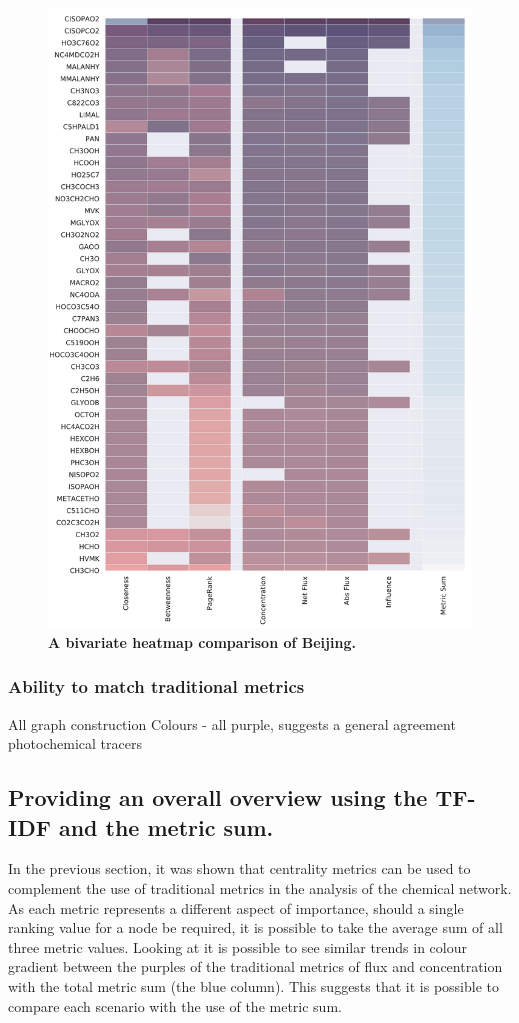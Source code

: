 \begin{figure}[H]
     \centering
         \includegraphics[width=.95\textwidth]{figures_c3/mlpregressor/aphh_Beijing.pdf}
        \caption{ \textbf{A bivariate heatmap comparison of Beijing.} }
        \label{fig:heatbj}
\end{figure}




  
\subsubsection*{Ability to match traditional metrics}
All graph construction
Colours - all purple, suggests a general agreement
photochemical tracers

\subsection{Providing an overall overview using the TF-IDF and the metric sum.}
In the previous section, it was shown that centrality metrics can be used to complement the use of traditional metrics in the analysis of the chemical network. As each metric represents a different aspect of importance, should a single ranking value for a node be required, it is possible to take the average sum of all three metric values. Looking at  it is possible to see similar trends in colour gradient between the purples of the traditional metrics of flux and concentration with the total metric sum (the blue column). This suggests that it is possible to compare each scenario with the use of the metric sum. 

